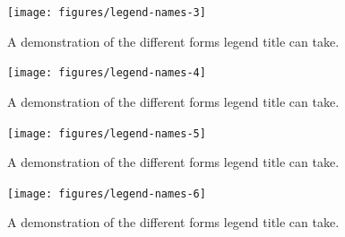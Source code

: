 \begin{Shaded}
\begin{Highlighting}[]
\StringTok{ }\NormalTok{(}\NormalTok{)}
\end{Highlighting}
\end{Shaded}

\begin{figure}
\texttt{[image: figures/legend-names-3]} \caption{A demonstration of the different forms legend title can take.\label{fig:legend-names3}}
\end{figure}

\begin{Shaded}
\begin{Highlighting}[]
\StringTok{ }\NormalTok{(}\NormalTok{)}
\end{Highlighting}
\end{Shaded}

\begin{figure}
\texttt{[image: figures/legend-names-4]} \caption{A demonstration of the different forms legend title can take.\label{fig:legend-names4}}
\end{figure}

\begin{Shaded}
\begin{Highlighting}[]
\StringTok{ }\NormalTok{(} \NormalTok{, } \NormalTok{, } \NormalTok{)}
\end{Highlighting}
\end{Shaded}

\begin{figure}
\texttt{[image: figures/legend-names-5]} \caption{A demonstration of the different forms legend title can take.\label{fig:legend-names5}}
\end{figure}

\begin{Shaded}
\begin{Highlighting}[]
\StringTok{ }\NormalTok{(}\NormalTok{(}
\end{Highlighting}
\end{Shaded}

\begin{figure}
\texttt{[image: figures/legend-names-6]} \caption{A demonstration of the different forms legend title can take.\label{fig:legend-names6}}
\end{figure}

